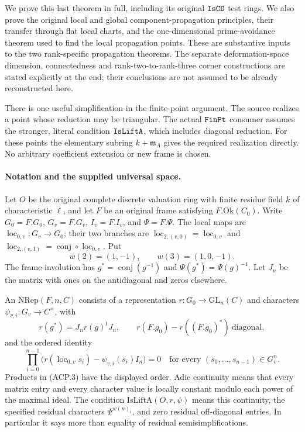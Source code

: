 \documentclass[11pt,a4paper]{article}
\numberwithin{equation}{section}
\theoremstyle{remark}\newtheorem{remark}[theorem]{Remark}
\begin{document}
We prove this last theorem in full, including its original
\(\texttt{Is\allowbreak CD}\) test rings.  We also prove the original local and
global component-propagation principles, their transfer through flat
local charts, and the one-dimensional prime-avoidance theorem used
to find the local propagation points.  These are substantive inputs
to the two rank-specific propagation theorems.  The separate
deformation-space dimension, connectedness and rank-two-to-rank-three
corner constructions are stated explicitly at the end; their
conclusions are not assumed to be already reconstructed here.

There is one useful simplification in the finite-point argument.
The source realizes a point whose reduction may be triangular.
The actual \(\texttt{Fin\allowbreak Pt}\) consumer assumes the stronger,
literal condition \(\texttt{Is\allowbreak Lift\allowbreak A}\), which includes diagonal
reduction.  For these points the elementary subring
\(k+\mathfrak m_A\) gives the required realization directly.
No arbitrary coefficient extension or new frame is chosen.

\paragraph{Notation and the supplied universal space.}
Let \(O\) be the original complete discrete valuation ring with
finite residue field \(k\) of characteristic \(\ell\), and let
\(F\) be an original frame satisfying \(F.\mathrm{Ok}(C_0)\).
Write \(G_0=F.G_0\), \(G_v=F.G_v\), \(I_v=F.I_v\), and
\(\Psi=F.\Psi\).  The local maps are
\(\operatorname{loc}_{0,v}:G_v\to G_0\); their two branches are
\(\operatorname{loc}_{2,(v,0)}=\operatorname{loc}_{0,v}\) and
\(\operatorname{loc}_{2,(v,1)}=\operatorname{conj}\circ
\operatorname{loc}_{0,v}\).  Put
\[
 w(2)=(1,-1),\qquad w(3)=(1,0,-1).
                                                        \tag{ACP.1}
\]
The frame involution has
\(g^*=\operatorname{conj}(g^{-1})\) and
\(\Psi(g^*)=\Psi(g)^{-1}\).  Let \(J_n\) be the matrix with
ones on the antidiagonal and zeros elsewhere.

An \(\mathrm{NRep}(F,n,C)\) consists of a representation
\(r:G_0\to\mathrm{GL}_n(C)\) and characters
\(\psi_{v,i}:G_v\to C^\times\), with
\[
 r(g^*)=J_nr(g)^tJ_n,
 \qquad r(F.g_0)-r((F.g_0)^*)\ \text{diagonal},
                                                        \tag{ACP.2}
\]
and the ordered identity
\[
 \prod_{i=0}^{n-1}
 \bigl(r(\operatorname{loc}_{0,v}s_i)
                         -\psi_{v,i}(s_i)I_n\bigr)=0
 \quad\text{for every }(s_0,\ldots,s_{n-1})\in G_v^n.
                                                        \tag{ACP.3}
\]
Products in (ACP.3) have the displayed order.
Adic continuity means that every matrix entry and every character
value is locally constant modulo each power of the maximal ideal.
The condition \(\mathrm{IsLiftA}(O,r,\psi)\) means this continuity,
the specified residual characters \(\Psi^{w(n)_i}\), and zero
residual off-diagonal entries.  In particular it says more than
equality of residual semisimplifications.
\end{document}
